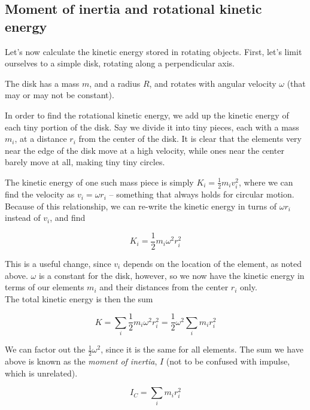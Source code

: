 \documentclass[8.01x]{subfiles}
\begin{document}
\subsection{Moment of inertia and rotational kinetic energy}

Let's now calculate the kinetic energy stored in rotating objects. First, let's limit ourselves to a simple disk, rotating along a perpendicular axis.

The disk has a mass $m$, and a radius $R$, and rotates with angular velocity $\omega$ (that may or may not be constant).

In order to find the rotational kinetic energy, we add up the kinetic energy of each tiny portion of the disk. Say we divide it into tiny pieces, each with a mass $m_i$, at a distance $r_i$ from the center of the disk.  It is clear that the elements very near the edge of the disk move at a high velocity, while ones near the center barely move at all, making tiny tiny circles.

The kinetic energy of one such mass piece is simply $\displaystyle K_i = \frac{1}{2} m_i v_i^2$, where we can find the velocity as $v_i = \omega r_i$ -- something that always holds for circular motion. Because of this relationship, we can re-write the kinetic energy in turns of $\omega r_i$ instead of $v_i$, and find

\begin{equation}
K_i = \frac{1}{2} m_i \omega^2 r_i^2
\end{equation}

This is a useful change, since $v_i$ depends on the location of the element, as noted above. $\omega$ is a constant for the disk, however, so we now have the kinetic energy in terms of our elements $m_i$ and their distances from the center $r_i$ only.\\
The total kinetic energy is then the sum

\begin{equation}
K = \sum_i \frac{1}{2} m_i \omega^2 r_i^2 = \frac{1}{2} \omega^2 \sum_i m_i r_i^2
\end{equation}

We can factor out the $\displaystyle \frac{1}{2} \omega^2$, since it is the same for all elements. The sum we have above is known as the \emph{moment of inertia}, $I$ (not to be confused with impulse, which is unrelated).

\begin{equation}
I_C = \sum_i m_i r_i^2
\end{equation}
\end{document}
